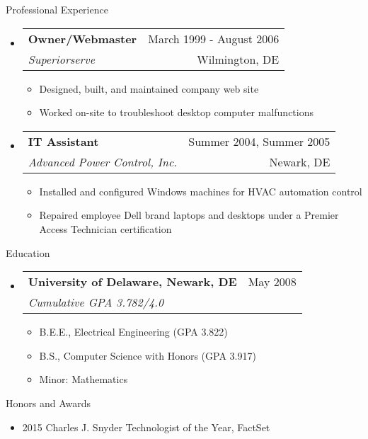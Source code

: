 \documentclass[letterpaper,10pt]{article}
\makeatletter
\newenvironment{ressection}[1]{
	\vspace{4pt}
	{\fontfamily{phv}\selectfont\Large#1}
	\begin{itemize}
	\vspace{3pt}
}{
	\end{itemize}
}
\newcommand{\resitem}[1]{
	\vspace{-4pt}
	\item \begin{flushleft} #1 \end{flushleft}
}
\newcommand{\ressubitem}[1]{
	\vspace{-1pt}
	\item \begin{flushleft} #1 \end{flushleft}
}
\newcommand{\resbigitem}[4]{
	\vspace{-5pt}
	\item
	\begin{tabular*}{6in}{l@{\extracolsep{\fill}}r}
		\textbf{#1} & #2 \\
		\textit{#3} & #4\\
	\end{tabular*}
}
\newenvironment{ressubsec}[4]{
	\resbigitem{#1}{#2}{#3}{#4}
	\vspace{-2pt}
	\begin{itemize}
}{
	\end{itemize}
}
\makeatother
\begin{document}
\begin{ressection}{Professional Experience}
	\begin{ressubsec}{Owner/Webmaster}{March 1999 - August 2006}{Superiorserve}{Wilmington, DE}
		\ressubitem{Designed, built, and maintained company web site}
		\ressubitem{Worked on-site to troubleshoot desktop computer malfunctions}
	\end{ressubsec}

	\begin{ressubsec}{IT Assistant}{Summer 2004, Summer 2005}{Advanced Power Control, Inc.}{Newark, DE}
		\ressubitem{Installed and configured Windows machines for HVAC automation control}
		\ressubitem{Repaired employee Dell brand laptops and desktops under a Premier Access Technician certification}
	\end{ressubsec}
\end{ressection}

\begin{ressection}{Education}
	\begin{ressubsec}{University of Delaware, Newark, DE}{May 2008}{Cumulative GPA 3.782/4.0}{}
		\ressubitem{B.E.E., Electrical Engineering (GPA 3.822)}
		\ressubitem{B.S., Computer Science with Honors (GPA 3.917)}
		\ressubitem{Minor: Mathematics}
	\end{ressubsec}
\end{ressection}

\begin{ressection}{Honors and Awards}
	\resitem{2015 Charles J. Snyder Technologist of the Year, FactSet}
\end{ressection}
\end{document}
